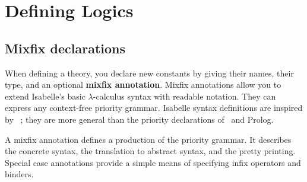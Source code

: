 
\chapter{Defining Logics} \label{Defining-Logics}

\section{Mixfix declarations} \label{sec:mixfix}

When defining a theory, you declare new constants by giving their names,
their type, and an optional {\bf mixfix annotation}.  Mixfix annotations
allow you to extend Isabelle's basic $\lambda$-calculus syntax with
readable notation.  They can express any context-free priority grammar.
Isabelle syntax definitions are inspired by \OBJ~\cite{OBJ}; they are more
general than the priority declarations of \ML\ and Prolog.

A mixfix annotation defines a production of the priority grammar.  It
describes the concrete syntax, the translation to abstract syntax, and the
pretty printing.  Special case annotations provide a simple means of
specifying infix operators and binders.

